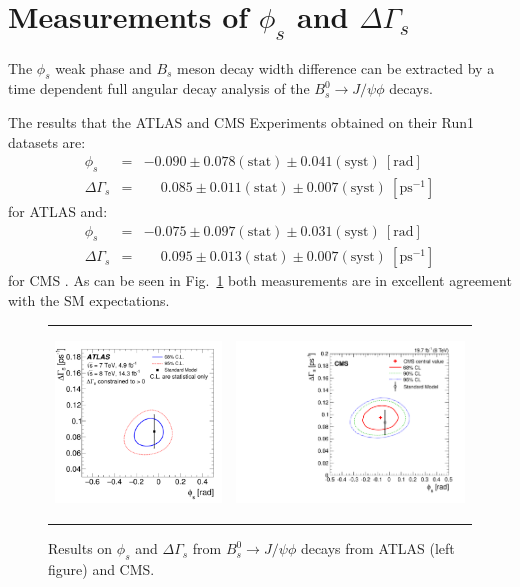 \section{Measurements of $\phi_s$ and $\Delta\Gamma_s$}

The $\phi_s$ weak phase and $B_s$ meson decay width difference can
be extracted by a time dependent full angular decay analysis of the 
$B^0_s \to J/\psi \phi$ decays.

The results that the ATLAS and CMS Experiments obtained on their Run1
datasets are:
\begin{eqnarray}
  \phi_s & = & -0.090 \pm 0.078 (\mbox{stat}) \pm 0.041 (\mbox{syst})\:[\mbox{rad}] \\
  \Delta\Gamma_s & = & \phantom{-}0.085 \pm 0.011 (\mbox{stat}) \pm 0.007 (\mbox{syst})\:[\mbox{ps}^{-1}]
\end{eqnarray}
for ATLAS \cite{atlas_phis_8TeV} and:
\begin{eqnarray}
  \phi_s & = & -0.075 \pm 0.097 (\mbox{stat}) \pm 0.031 (\mbox{syst})\:[\mbox{rad}] \\
  \Delta\Gamma_s & = & \phantom{-}0.095 \pm 0.013 (\mbox{stat}) \pm 0.007 (\mbox{syst})\:[\mbox{ps}^{-1}]
\end{eqnarray}
for CMS \cite{cms_phis}. As can be seen in Fig.~\ref{phis_atlas_cms} both measurements are in
excellent agreement with the SM expectations.

\begin{figure}
  \begin{center}
    \begin{tabular}{c c}
      \includegraphics[height=5cm]{figs/atlas_phis_result.pdf} &
      \includegraphics[height=5cm]{figs/cms_phis_result.pdf} 
    \end{tabular}
  \end{center}
  \caption{\label{phis_atlas_cms}Results on $\phi_s$ and $\Delta\Gamma_s$ from
  $B^0_s \to J/\psi \phi$ decays from ATLAS (left figure) and CMS.}
\end{figure}
